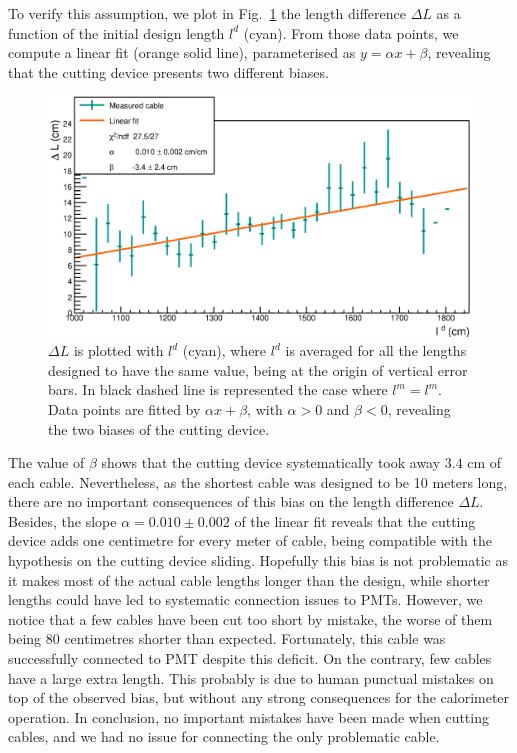 To verify this assumption, we plot in Fig.~\ref{fig:CutBias} the length difference $\Delta L$ as a function of the initial design length $l^{d}$ (cyan).
From those data points, we compute a linear fit (orange solid line), parameterised as $y = \alpha x + \beta$, revealing that the cutting device presents two different biases.
\begin{figure}[h]
  \centering
  \includegraphics[width=15cm]{commissioning/fig_commissioning/cut_biais.eps}

  \caption{$\Delta L$ is plotted with $l^{d}$ (cyan), where $l^{d}$ is averaged for all the lengths designed to have the same value, being at the origin of vertical error bars.
    In black dashed line is represented the case where $l^{m} = l^{m}$.
    Data points are fitted by $\alpha x + \beta$, with $\alpha > 0$ and $\beta < 0$, revealing the two biases of the cutting device.
    \label{fig:CutBias}}
\end{figure}
The value of $\beta$ shows that the cutting device systematically took away $3.4$ cm of each cable.
Nevertheless, as the shortest cable was designed to be 10 meters long, there are no important consequences of this bias on the length difference $\Delta L$.
Besides, the slope $\alpha = 0.010\pm 0.002$ of the linear fit reveals that the cutting device adds one centimetre for every meter of cable, being compatible with the hypothesis on the cutting device sliding.
Hopefully this bias is not problematic as it makes most of the actual cable lengths longer than the design, while shorter lengths could have led to systematic connection issues to PMTs.
However, we notice that a few cables have been cut too short by mistake, the worse of them being $80$ centimetres shorter than expected.
Fortunately, this cable  was successfully connected to PMT despite this deficit.
On the contrary, few cables have a large extra length.
This probably is due to human punctual mistakes on top of the observed bias, but without any strong consequences for the calorimeter operation.
In conclusion, no important mistakes have been made when cutting cables, and we had no issue for connecting the only problematic cable.

